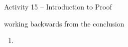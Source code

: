 \documentclass{amsart}
\begin{document}
\thispagestyle{empty}

\centerline{\Large Activity 15 -- Introduction to Proof}
\centerline{\large working backwards from the conclusion}

\bigskip
\Large


\begin{enumerate}

\item

\vfill

\end{enumerate}
\end{document}
